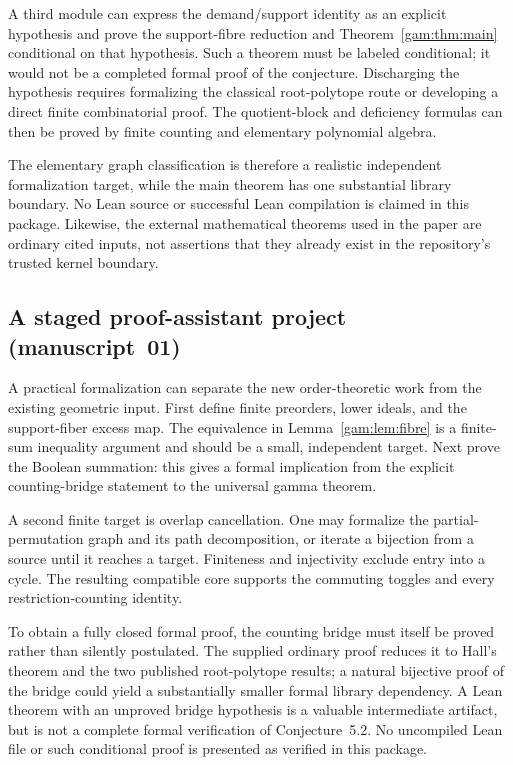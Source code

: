 \documentclass[11pt]{article}
\numberwithin{equation}{section}
\theoremstyle{definition}
\begin{document}
A third module can express the demand/support identity as an explicit
hypothesis and prove the support-fibre reduction and
Theorem~\ref{gam:thm:main} conditional on that hypothesis. Such a theorem must
be labeled conditional; it would not be a completed formal proof of the
conjecture. Discharging the hypothesis requires formalizing the classical
root-polytope route or developing a direct finite combinatorial proof.
The quotient-block and deficiency formulas can then be proved by finite
counting and elementary polynomial algebra.

The elementary graph classification is therefore a realistic independent
formalization target, while the main theorem has one substantial library
boundary. No Lean source or successful Lean compilation is claimed in this
package. Likewise, the external mathematical theorems used in the paper
are ordinary cited inputs, not assertions that they already exist in the
repository's trusted kernel boundary.

\subsection{A staged proof-assistant project (manuscript~01)}
A practical formalization can separate the new order-theoretic work from
the existing geometric input. First define finite preorders, lower ideals,
and the support-fiber excess map. The equivalence in
Lemma~\ref{gam:lem:fibre} is a finite-sum inequality argument and should be a
small, independent target. Next prove the Boolean summation: this gives a
formal implication from the explicit counting-bridge statement to the
universal gamma theorem.

A second finite target is overlap cancellation. One may formalize the
partial-permutation graph and its path decomposition, or iterate a
bijection from a source until it reaches a target. Finiteness and injectivity
exclude entry into a cycle. The resulting compatible core supports the
commuting toggles and every restriction-counting identity.

To obtain a fully closed formal proof, the counting bridge must itself be
proved rather than silently postulated. The supplied ordinary proof reduces
it to Hall's theorem and the two published root-polytope results; a natural
bijective proof of the bridge could yield a substantially smaller formal
library dependency. A Lean theorem with an unproved bridge hypothesis is a
valuable intermediate artifact, but is not a complete formal verification
of Conjecture~5.2. No uncompiled Lean file or such conditional proof is
presented as verified in this package.
\end{document}
